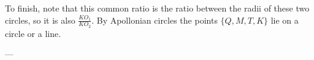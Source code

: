 To finish, note that this common ratio is the ratio between the radii
of these two circles, so it is also $\frac{KO_1}{KO_2}$.
By Apollonian circles the points $\{Q,M,T,K\}$ lie on a circle or a line.

---


